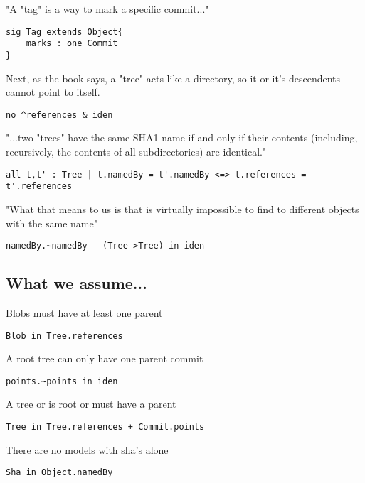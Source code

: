 "A "tag" is a way to mark a specific commit..."

\begin{lstlisting}
sig Tag extends Object{
	marks : one Commit
}
\end{lstlisting}


Next, as the book \cite{gitComm} says, a "tree" acts
like a directory, so it or it's descendents cannot point
to itself.

\begin{lstlisting}
no ^references & iden 
\end{lstlisting}

"...two "trees" have the same SHA1 name if and only if their
contents (including, recursively, the contents of all subdirectories)
are identical."

\begin{lstlisting}
all t,t' : Tree | t.namedBy = t'.namedBy <=> t.references = t'.references
\end{lstlisting}

"What that means to us is that is virtually impossible to find to 
different objects with the same name"

\begin{lstlisting}
namedBy.~namedBy - (Tree->Tree) in iden
\end{lstlisting}



\subsection{What we assume...}

Blobs must have at least one parent

\begin{lstlisting}
Blob in Tree.references
\end{lstlisting}

A root tree can only have one parent commit
\begin{lstlisting}
points.~points in iden 
\end{lstlisting}

A tree or is root or must have a parent
\begin{lstlisting}
Tree in Tree.references + Commit.points
\end{lstlisting}

There are no models with sha's alone
\begin{lstlisting}
Sha in Object.namedBy
\end{lstlisting}
